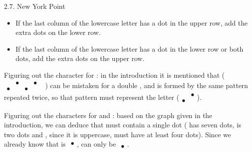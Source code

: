 \begin{refsection}
\begin{practiceproblemsolution}{2.7. New York Point}
\begin{itemize}
    \item If the last column of the lowercase letter has a dot in the upper row, add the extra dots on the lower row.
    \item If the last column of the lowercase letter has a dot in the lower row or both dots, add the extra dots on the upper row.
\end{itemize}
\end{practiceproblemsolution}

\begin{discussion}
\begin{sloppypar}
Figuring out the character for : in the introduction it is mentioned that  ({\Large \boldmath$\begin{smallmatrix}
    &\bullet&&\bullet&  \\  \bullet&&\bullet&
\end{smallmatrix}$}) can be mistaken for a double , and  is formed by the same pattern repeated twice, so that pattern must represent the letter  ({\Large \boldmath$\begin{smallmatrix} 
   & \bullet  \\  \bullet& 
\end{smallmatrix}$}).
\end{sloppypar}

Figuring out the characters for  and : based on the graph given in the introduction, we can deduce that  must contain a single dot ( has seven dots,  is two dots and , since it is uppercase, must have at least four dots). Since we already know that  is {\Large \boldmath$\begin{smallmatrix}
    \bullet  \\   
\end{smallmatrix}$},  can only be {\Large \boldmath$\begin{smallmatrix} 
     \\  \bullet 
\end{smallmatrix}$}.


\end{discussion}
\end{refsection}
